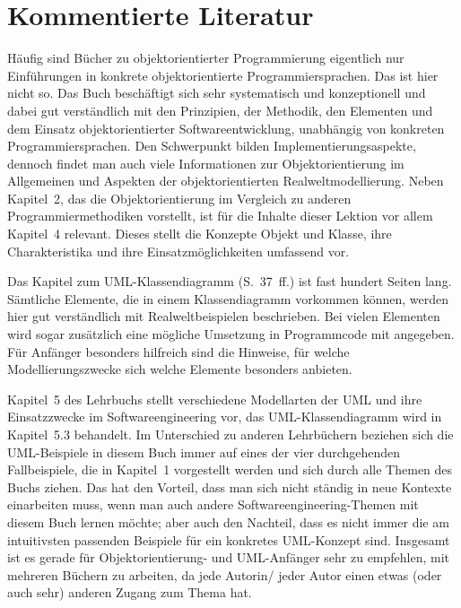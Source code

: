 \section{Kommentierte Literatur}
\label{sec:Kap-4.4}


{Häufig sind Bücher zu objektorientierter Programmierung eigentlich nur Einführungen in konkrete objektorientierte Programmiersprachen. Das ist hier nicht so. Das Buch beschäftigt sich sehr systematisch und konzeptionell und dabei gut verständlich mit den Prinzipien, der Methodik, den Elementen und dem Einsatz objektorientierter Softwareentwicklung, unabhängig von konkreten Programmiersprachen. Den Schwerpunkt bilden Implementierungsaspekte, dennoch findet man auch viele Informationen zur Objektorientierung im Allgemeinen und Aspekten der objektorientierten Realweltmodellierung. Neben Kapitel~2, das die Objektorientierung im Vergleich zu anderen Programmiermethodiken vorstellt, ist für die Inhalte dieser Lektion vor allem Kapitel~4 relevant. Dieses stellt die Konzepte Objekt und Klasse, ihre Charakteristika und ihre Einsatzmöglichkeiten umfassend vor.}

{Das Kapitel zum UML-Klassendiagramm (S.~37~ff.) ist fast hundert Seiten lang. Sämtliche Elemente, die in einem Klassendiagramm vorkommen können, werden hier gut verständlich mit Realweltbeispielen beschrieben. Bei vielen Elementen wird sogar zusätzlich eine mögliche Umsetzung in Programmcode mit angegeben. Für Anfänger besonders hilfreich sind die Hinweise, für welche Modellierungszwecke sich welche Elemente besonders anbieten.}

{Kapitel~5 des Lehrbuchs stellt verschiedene Modellarten der UML und ihre Einsatzzwecke im Softwareengineering vor, das UML-Klassendiagramm wird in Kapitel~5.3 behandelt. Im Unterschied zu anderen Lehrbüchern beziehen sich die UML-Beispiele in diesem Buch immer auf eines der vier durchgehenden Fallbeispiele, die in Kapitel~1 vorgestellt werden und sich durch alle Themen des Buchs ziehen. Das hat den Vorteil, dass man sich nicht ständig in neue Kontexte einarbeiten muss, wenn man auch andere Softwareengineering-Themen mit diesem Buch lernen möchte; aber auch den Nachteil, dass es nicht immer die am intuitivsten passenden Beispiele für ein konkretes UML-Konzept sind. Insgesamt ist es gerade für Objektorientierung- und UML-Anfänger sehr zu empfehlen, mit mehreren Büchern zu arbeiten, da jede Autorin/ jeder Autor einen etwas (oder auch sehr) anderen Zugang zum Thema hat.}


